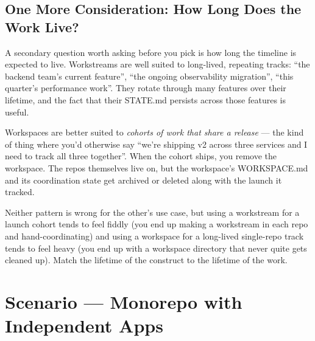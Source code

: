 \documentclass[11pt,letterpaper,openany]{book}
\begin{document}
\section{One More Consideration: How Long Does the Work Live?}

A secondary question worth asking before you pick is how long the
timeline is expected to live. Workstreams are well suited to long-lived,
repeating tracks: ``the backend team's current feature'', ``the ongoing
observability migration'', ``this quarter's performance work''. They
rotate through many features over their lifetime, and the fact that
their STATE.md persists across those features is useful.

Workspaces are better suited to \emph{cohorts of work that share a
release} --- the kind of thing where you'd otherwise say ``we're
shipping v2 across three services and I need to track all three
together''. When the cohort ships, you remove the workspace. The
repos themselves live on, but the workspace's WORKSPACE.md and its
coordination state get archived or deleted along with the launch
it tracked.

Neither pattern is wrong for the other's use case, but using a
workstream for a launch cohort tends to feel fiddly (you end up
making a workstream in each repo and hand-coordinating) and using
a workspace for a long-lived single-repo track tends to feel heavy
(you end up with a workspace directory that never quite gets cleaned
up). Match the lifetime of the construct to the lifetime of the work.

\chapter{Scenario --- Monorepo with Independent Apps}
\end{document}

